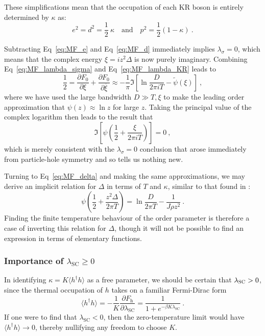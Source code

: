 
These simplifications mean that the occupation of each KR boson is entirely determined by $ \kappa $ as:
\begin{equation}
e^2 = d^2 = \frac{1}{2} ~ \kappa \quad \text{and} \quad p^2 = \frac{1}{2} (1 - \kappa) ~ .
\label{eq:soln_KR}
\end{equation}

Subtracting Eq~\eqref{eq:MF_e} and Eq~\eqref{eq:MF_d} immediately implies $ \lambda_{\sigma} = 0 $, which means that the complex energy $ \xi = i z^2 \Delta $ is now purely imaginary. Combining Eq~\eqref{eq:MF_lambda_sigma} and Eq~\eqref{eq:MF_lambda_KR} leads to $$ \frac{1}{2} = \frac{\partial F_0}{\partial \xi} + \frac{\partial F_0}{\partial \overline{\xi}} \approx - \frac{1}{\pi} \Im{\left[ \ln{\frac{D}{2 \pi i T}} - \widetilde{\psi}(\xi) \right]} ~ , $$ where we have used the large bandwidth $ D \gg T, \xi $ to make the leading order approximation that $ \psi(z) \approx \ln{z} $ for large $ z $. Taking the principal value of the complex logarithm then leads to the result that $$ \Im{\left[ \psi \left( \frac{1}{2} + \frac{\xi}{2 \pi i T} \right) \right] = 0} ~ , $$ which is merely consistent with the $ \lambda_{\sigma} = 0 $ conclusion that arose immediately from particle-hole symmetry and so tells us nothing new.

Turning to Eq~\eqref{eq:MF_delta} and making the same approximations, we may derive an implicit relation for $ \Delta $ in terms of $ T $ and $ \kappa $, similar to that found in \cite{ManyBodyPhysics}:
\begin{equation}
\psi \left( \frac{1}{2} + \frac{z^2 \Delta}{2 \pi T} \right) = \ln{\frac{D}{2 \pi T}} - \frac{1}{J \rho z^2} ~ .
\label{eq:soln_delta}
\end{equation}
Finding the finite temperature behaviour of the order parameter is therefore a case of inverting this relation for $ \Delta $, though it will not be possible to find an expression in terms of elementary functions. %

\subsubsection{Importance of $ \lambda_{\text{SC}} \geq 0 $}

In identifying $ \kappa = K \langle h^{\dagger} h \rangle $ as a free parameter, we should be certain that $ \lambda_{\textsc{SC}} > 0 $, since the thermal occupation of $ h $ takes on a familiar Fermi-Dirac form $$ \langle h^{\dagger} h \rangle = - \frac{1}{K} \frac{\partial F_{\text{h}}}{\partial \lambda_{\text{SC}}} = \frac{1}{1 + e^{- \beta K \lambda_{\text{SC}}}} ~. $$ If one were to find that $ \lambda_{\text{SC}} < 0 $, then the zero-temperature limit would have $ \langle h^{\dagger} h \rangle \rightarrow 0 $, thereby nullifying any freedom to choose $ K $.

